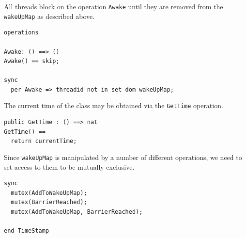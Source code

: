 \documentclass{overturerepchap}
\begin{document}
All threads block on the operation \texttt{Awake} until they are removed from
the \texttt{wakeUpMap} as described above.

\begin{lstlisting}
operations

Awake: () ==> ()
Awake() == skip;

sync
  per Awake => threadid not in set dom wakeUpMap;
\end{lstlisting}

The current time of the class may be obtained via the \texttt{GetTime}
operation.

\begin{lstlisting}
public GetTime : () ==> nat
GetTime() ==
  return currentTime;
\end{lstlisting}

Since \texttt{wakeUpMap} is manipulated by a number of different
operations, we need to set access to them to be mutually exclusive.

\begin{lstlisting}
sync
  mutex(AddToWakeUpMap);
  mutex(BarrierReached);
  mutex(AddToWakeUpMap, BarrierReached);

end TimeStamp
\end{lstlisting}

%

%
%
%
%
%
%

%
%
\end{document}
